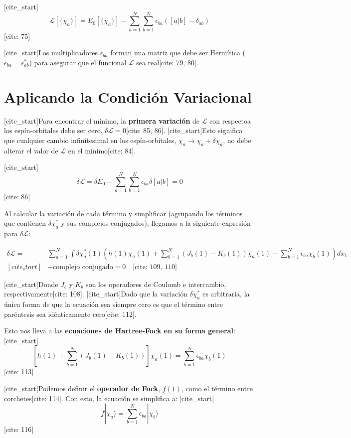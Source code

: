 \documentclass[12pt,a4paper]{article}
\begin{document}
[cite_start]$$ \mathcal{L}[\{\chi_a\}] = E_0[\{\chi_a\}] - \sum_{a=1}^{N}\sum_{b=1}^{N}\epsilon_{ba}([a|b] - \delta_{ab}) $$ [cite: 75]

[cite_start]Los multiplicadores $\epsilon_{ba}$ forman una matriz que debe ser Hermítica ($\epsilon_{ba} = \epsilon_{ab}^*$) para asegurar que el funcional $\mathcal{L}$ sea real[cite: 79, 80].

\section{Aplicando la Condición Variacional}

[cite_start]Para encontrar el mínimo, la \textbf{primera variación} de $\mathcal{L}$ con respectoa los espín-orbitales debe ser cero, $\delta\mathcal{L} = 0$[cite: 85, 86]. [cite_start]Esto significa que cualquier cambio infinitesimal en los espín-orbitales, $\chi_a \rightarrow \chi_a + \delta\chi_a$, no debe alterar el valor de $\mathcal{L}$ en el mínimo[cite: 84].

[cite_start]$$ \delta\mathcal{L} = \delta E_0 - \sum_{a=1}^{N}\sum_{b=1}^{N}\epsilon_{ba}\delta[a|b] = 0 $$ [cite: 86]

Al calcular la variación de cada término y simplificar (agrupando los términos que contienen $\delta\chi_a^*$ y sus complejos conjugados), llegamos a la siguiente expresión para $\delta\mathcal{L}$:

\begin{align*}
\delta\mathcal{L} = & \sum_{a=1}^{N} \int \delta\chi_a^*(1) \left( h(1)\chi_a(1) + \sum_{b=1}^{N} (J_b(1) - K_b(1))\chi_a(1) - \sum_{b=1}^{N}\epsilon_{ba}\chi_b(1) \right) dx_1 \\
[cite_start]& + \text{complejo conjugado} = 0 \quad \text{[cite: 109, 110]}
\end{align*}

[cite_start]Donde $J_b$ y $K_b$ son los operadores de Coulomb e intercambio, respectivamente[cite: 108]. [cite_start]Dado que la variación $\delta\chi_a^*$ es arbitraria, la única forma de que la ecuación sea siempre cero es que el término entre paréntesis sea idénticamente cero[cite: 112].

Esto nos lleva a las \textbf{ecuaciones de Hartree-Fock en su forma general}:
[cite_start]$$ \left[ h(1) + \sum_{b=1}^{N} (J_b(1) - K_b(1)) \right] \chi_a(1) = \sum_{b=1}^{N}\epsilon_{ba}\chi_b(1) $$ [cite: 113]

[cite_start]Podemos definir el \textbf{operador de Fock}, $f(1)$, como el término entre corchetes[cite: 114]. Con esto, la ecuación se simplifica a:
[cite_start]$$ f|\chi_a\rangle = \sum_{b=1}^{N}\epsilon_{ba}|\chi_b\rangle $$ [cite: 116]
\end{document}
